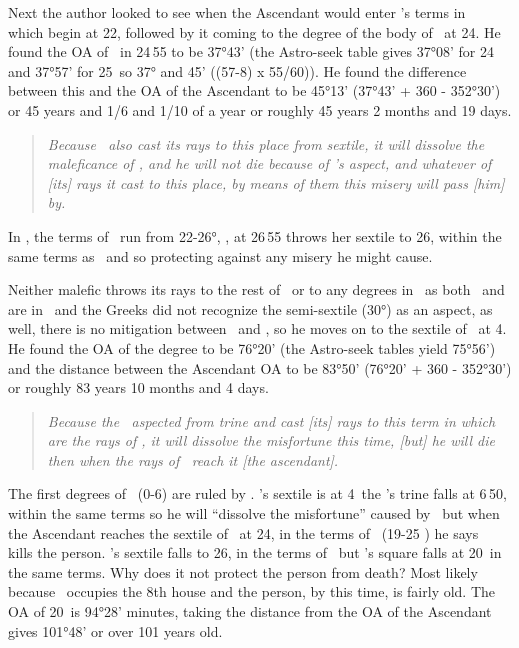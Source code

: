 Next  the author looked to see when the Ascendant would enter \Saturn's terms in \Taurus\, which begin at 22\Taurus, followed by it coming to the degree of the body of \Mars\, at 24\Taurus. He found the OA of \Mars\, in 24\Taurus\,55 to be 37°43' (the Astro-seek table gives 37°08' for 24\Taurus\, and 37°57' for 25\Taurus\, so 37° and 45' ((57-8) x 55/60)). He found the difference between this and the OA of the Ascendant to be 45°13' (37°43' + 360 - 352°30') or  45 years and 1/6 and 1/10 of a year or roughly 45 years 2 months and 19 days. 

\begin{quote}
\textsl{Because  \Venus\, also cast its rays to this place from sextile, it will dissolve the maleficance of \Mars, and he will not die because of \Venus's aspect, and whatever of [its] rays it cast to this place, by means of them this misery will pass [him] by.
}
\end{quote}

In \Taurus, the terms of \Saturn\, run from 22-26°, \Venus, at 26\Pisces\,55 throws her sextile to 26\Taurus, within the same terms as \Mars\, and so protecting against any misery he might cause.

Neither   malefic throws its rays to the rest of \Taurus\, or to any degrees in \Gemini\, as both \Saturn\, and \Mars\, are in \Taurus\, and the Greeks did not recognize the semi-sextile (30°) as an aspect, as well, there is no mitigation between \Taurus\, and \Gemini, so he moves on to the sextile of \Saturn\, at 4. He found the OA of the degree to be 76°20' (the Astro-seek tables yield 75°56') and the distance between the Ascendant OA to be 83°50' (76°20' + 360 - 352°30') or roughly 83 years 10 months and 4 days.
\begin{quote}
\textsl{Because the \Sun\, aspected from trine and cast [its] rays to this term in which are the rays of \Saturn, it will dissolve the misfortune this time, [but] he will die then when the rays of \Mars\, reach it [the ascendant].}
\end{quote}

The first degrees of \Cancer\, (0-6) are ruled by \Mars. \Saturn's sextile is at 4\Cancer\, the \Sun's trine falls at 6\Cancer\,50, within the same terms so he will ``dissolve the misfortune'' caused by \Saturn\, but when the Ascendant reaches the sextile of \Mars\, at 24\Cancer, in the terms of \Jupiter\, (19-25 \Cancer) he says  \Mars\, kills the person. \Venus's sextile falls to 26\Cancer, in the terms of \Saturn\, but \Jupiter's square falls at 20\Cancer\, in the same terms. Why does it not protect the person from death?  Most likely because \Jupiter\ occupies the 8th house and the person, by this time, is fairly old. The OA of 20\Cancer\, is 94°28' minutes, taking the distance from the OA of the Ascendant gives 101°48' or over 101 years old.

